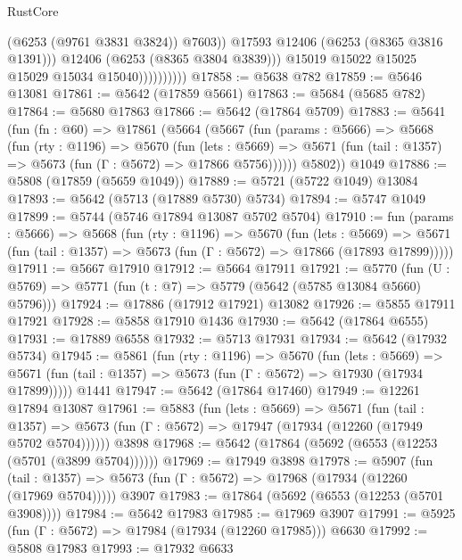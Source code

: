 \begin{lexlean}{RustCore}
\begin{coremodule}
                                (@6253 (@9761 @3831 @3824))
                                @7603))
                            @17593
                            @12406
                            (@6253 (@8365 @3816 @1391)))
                          @12406
                          (@6253 (@8365 @3804 @3839)))
                        @15019
                        @15022
                        @15025
                        @15029
                        @15034
                        @15040))))))))))
@17858 := @5638 @782
@17859 := @5646 @13081
@17861 := @5642 (@17859 @5661)
@17863 := @5684 (@5685 @782)
@17864 := @5680 @17863
@17866 := @5642 (@17864 @5709)
@17883 := @5641
    (fun (fn : @60) =>
    @17861
      (@5664
        (@5667
          (fun (params : @5666) =>
          @5668
            (fun (rty : @1196) =>
            @5670
              (fun (lets : @5669) =>
              @5671 (fun (tail : @1357) => @5673 (fun (Γ : @5672) => @17866 @5756))))))
        @5802))
    @1049
@17886 := @5808 (@17859 (@5659 @1049))
@17889 := @5721 (@5722 @1049) @13084
@17893 := @5642 (@5713 (@17889 @5730) @5734)
@17894 := @5747 @1049
@17899 := @5744 (@5746 @17894 @13087 @5702 @5704)
@17910 := fun (params : @5666) =>
  @5668
    (fun (rty : @1196) =>
    @5670
      (fun (lets : @5669) =>
      @5671 (fun (tail : @1357) => @5673 (fun (Γ : @5672) => @17866 (@17893 @17899)))))
@17911 := @5667 @17910
@17912 := @5664 @17911
@17921 := @5770
    (fun (U : @5769) => @5771 (fun (t : @7) => @5779 (@5642 (@5785 @13084 @5660) @5796)))
@17924 := @17886 (@17912 @17921) @13082
@17926 := @5855 @17911 @17921
@17928 := @5858 @17910 @1436
@17930 := @5642 (@17864 @6555)
@17931 := @17889 @6558
@17932 := @5713 @17931
@17934 := @5642 (@17932 @5734)
@17945 := @5861
    (fun (rty : @1196) =>
    @5670
      (fun (lets : @5669) =>
      @5671 (fun (tail : @1357) => @5673 (fun (Γ : @5672) => @17930 (@17934 @17899)))))
    @1441
@17947 := @5642 (@17864 @17460)
@17949 := @12261 @17894 @13087
@17961 := @5883
    (fun (lets : @5669) =>
    @5671
      (fun (tail : @1357) =>
      @5673 (fun (Γ : @5672) => @17947 (@17934 (@12260 (@17949 @5702 @5704))))))
    @3898
@17968 := @5642 (@17864 (@5692 (@6553 (@12253 (@5701 (@3899 @5704))))))
@17969 := @17949 @3898
@17978 := @5907
    (fun (tail : @1357) => @5673 (fun (Γ : @5672) => @17968 (@17934 (@12260 (@17969 @5704)))))
    @3907
@17983 := @17864 (@5692 (@6553 (@12253 (@5701 @3908))))
@17984 := @5642 @17983
@17985 := @17969 @3907
@17991 := @5925 (fun (Γ : @5672) => @17984 (@17934 (@12260 @17985))) @6630
@17992 := @5808 @17983
@17993 := @17932 @6633

\end{coremodule}
\end{lexlean}
